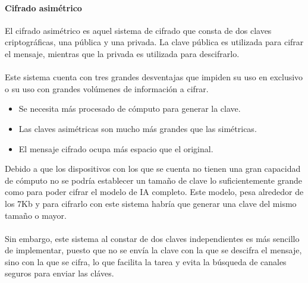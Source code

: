 \paragraph{Cifrado asimétrico}
El cifrado asimétrico es aquel sistema de cifrado que consta de dos claves criptográficas, una pública y una privada. La clave pública es utilizada para cifrar el mensaje, mientras que la privada es utilizada para descifrarlo. 
\\ \\
Este sistema cuenta con tres grandes desventajas que impiden su uso en exclusivo o su uso con grandes volúmenes de información a cifrar. 
\begin{itemize}
    \item Se necesita más procesado de cómputo para generar la clave.
    \item Las claves asimétricas son mucho más grandes que las simétricas.
    \item El mensaje cifrado ocupa más espacio que el original.
\end{itemize}

Debido a que los dispositivos con los que se cuenta no tienen una gran capacidad de cómputo no se podría establecer un tamaño de clave lo suficientemente grande como para poder cifrar el modelo de IA completo. Este modelo, pesa alrededor de los 7Kb y para cifrarlo con este sistema habría que generar una clave del mismo tamaño o mayor.
\\ \\
Sin embargo, este sistema al constar de dos claves independientes es más sencillo de implementar, puesto que no se envía la clave con la que se descifra el mensaje, sino con la que se cifra, lo que facilita la tarea y evita la búsqueda de canales seguros para enviar las cláves.

